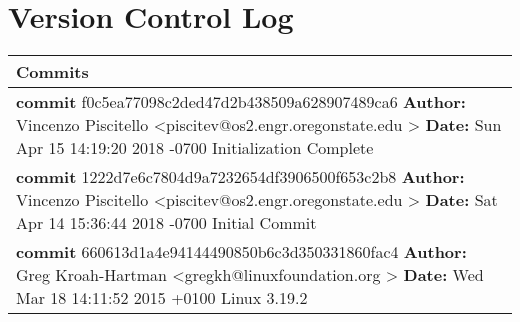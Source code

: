 \documentclass[10pt,draftclsnofoot,onecolumn]{IEEEtran}
\begin{document}
    \section{Version Control Log}
	\begin{center}
        \begin{tabular}{ | p{14cm} | }
        \hline
        {\bf Commits }\\ \hline
        {\bf commit} f0c5ea77098c2ded47d2b438509a628907489ca6\newline
        {\bf Author:} Vincenzo Piscitello \textless piscitev@os2.engr.oregonstate.edu \textgreater \newline
        {\bf Date:}   Sun Apr 15 14:19:20 2018 -0700\newline
        \newline Initialization Complete  \\ \hline
        {\bf commit} 1222d7e6c7804d9a7232654df3906500f653c2b8\newline
        {\bf Author:} Vincenzo Piscitello \textless piscitev@os2.engr.oregonstate.edu \textgreater \newline
        {\bf Date:}   Sat Apr 14 15:36:44 2018 -0700\newline
        \newline Initial Commit \\ \hline
        {\bf commit} 660613d1a4e94144490850b6c3d350331860fac4\newline
        {\bf Author:} Greg Kroah-Hartman \textless gregkh@linuxfoundation.org \textgreater \newline
        {\bf Date:}   Wed Mar 18 14:11:52 2015 +0100\newline
        \newline Linux 3.19.2  \\
        \hline
        \end{tabular}
    \end{center}

\end{document}
